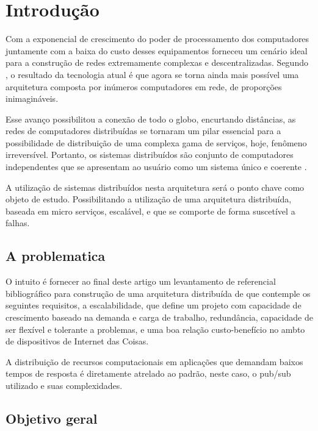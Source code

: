
\chapter{\textbf{Introdução}} %

Com a exponencial de crescimento do poder de processamento dos computadores juntamente com a baixa do custo desses equipamentos forneceu um cenário ideal para a construção de redes extremamente complexas e descentralizadas. Segundo \cite{vanSteen1999}, o resultado da tecnologia atual é que agora se torna ainda mais possível uma arquitetura composta por inúmeros computadores em rede, de proporções inimagináveis.\par
Esse avanço possibilitou a conexão de todo o globo, encurtando distâncias, as redes de computadores distribuídas se tornaram um pilar essencial para a possibilidade de distribuição de uma complexa gama de serviços, hoje, fenômeno irreversível. Portanto, os sistemas distribuídos são conjunto de computadores independentes que se apresentam ao usuário como um sistema único e coerente \cite{vanSteen2016}. \par
A utilização de sistemas distribuídos nesta arquitetura será o ponto chave como objeto de estudo. Possibilitando a utilização de uma arquitetura distribuída, baseada em micro serviços, escalável, e que se comporte de forma suscetível a falhas.


\section{A problematica}
O intuito é fornecer ao final deste artigo um levantamento de referencial bibliográfico para construção de uma arquitetura distribuída de que contemple os seguintes requisitos, a escalabilidade, que define um projeto com capacidade de crescimento baseado na demanda e carga de trabalho, redundância, capacidade de ser flexível e tolerante a problemas, e uma boa relação custo-benefício no ambto de dispositivos de Internet das Coisas.\par 
A distribuição de recursos computacionais em aplicações que demandam baixos tempos de resposta é diretamente atrelado ao padrão, neste caso, o pub/sub utilizado e suas complexidades.\par



\iffalse
\section{Objetivo geral}

